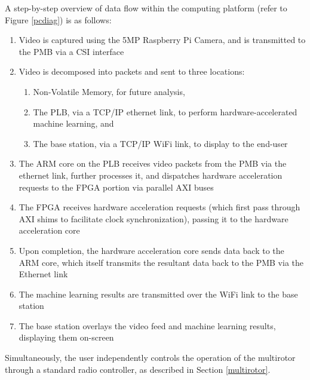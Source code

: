 A step-by-step overview of data flow within the computing platform (refer to Figure \ref{pcdiag}) is as follows:
\begin{enumerate}
\item Video is captured using the 5MP Raspberry Pi Camera, and is transmitted to the PMB via a CSI interface
\item Video is decomposed into packets and sent to three locations:
\begin{enumerate}
\item Non-Volatile Memory, for future analysis, 
\item The PLB, via a TCP/IP ethernet link, to perform hardware-accelerated machine learning, and
\item The base station, via a TCP/IP WiFi link, to display to the end-user
\end{enumerate}
\item The ARM core on the PLB receives video packets from the PMB via the ethernet link, further processes it, and dispatches  hardware acceleration requests to the FPGA portion via parallel AXI buses
\item The FPGA receives hardware acceleration requests (which first pass through AXI shims to facilitate clock synchronization), passing it to the hardware acceleration core
\item Upon completion, the hardware acceleration core sends data back to the ARM core, which itself transmits the resultant data back to the PMB via the Ethernet link
\item The machine learning results are transmitted over the WiFi link to the base station
\item The base station overlays the video feed and machine learning results, displaying them on-screen
\end{enumerate}

Simultaneously, the user independently controls the operation of the multirotor through a standard radio controller, as described in Section \ref{multirotor}.